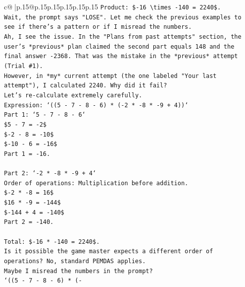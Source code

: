 \documentclass{article}
\begin{document}
{\begin{supertabular}{c@{$\;$}|p{.15\linewidth}@{}p{.15\linewidth}p{.15\linewidth}p{.15\linewidth}p{.15\linewidth}p{.15\linewidth}}
{{{\texttt{Product: \${-}16 \textbackslash{}times {-}140 = 2240\$.} \\
\texttt{Wait, the prompt says "LOSE". Let me check the previous examples to see if there's a pattern or if I misread the numbers.} \\
\texttt{Ah, I see the issue. In the "Plans from past attempts" section, the user's *previous* plan claimed the second part equals 148 and the final answer {-}2368. That was the mistake in the *previous* attempt (Trial \#1).} \\
\texttt{However, in *my* current attempt (the one labeled "Your last attempt"), I calculated 2240. Why did it fail?} \\
\texttt{Let's re{-}calculate extremely carefully.} \\
\texttt{Expression: `((5 {-} 7 {-} 8 {-} 6) * ({-}2 * {-}8 * {-}9 + 4))`} \\
\texttt{Part 1: `5 {-} 7 {-} 8 {-} 6`} \\
\texttt{\$5 {-} 7 = {-}2\$} \\
\texttt{\${-}2 {-} 8 = {-}10\$} \\
\texttt{\${-}10 {-} 6 = {-}16\$} \\
\texttt{Part 1 = {-}16.} \\
\\ 
\texttt{Part 2: `{-}2 * {-}8 * {-}9 + 4`} \\
\texttt{Order of operations: Multiplication before addition.} \\
\texttt{\${-}2 * {-}8 = 16\$} \\
\texttt{\$16 * {-}9 = {-}144\$} \\
\texttt{\${-}144 + 4 = {-}140\$} \\
\texttt{Part 2 = {-}140.} \\
\\ 
\texttt{Total: \${-}16 * {-}140 = 2240\$.} \\
\texttt{Is it possible the game master expects a different order of operations? No, standard PEMDAS applies.} \\
\texttt{Maybe I misread the numbers in the prompt?} \\
\texttt{`((5 {-} 7 {-} 8 {-} 6) * ({-}} \\
\\ 
}}}
\end{supertabular}}
\end{document}
